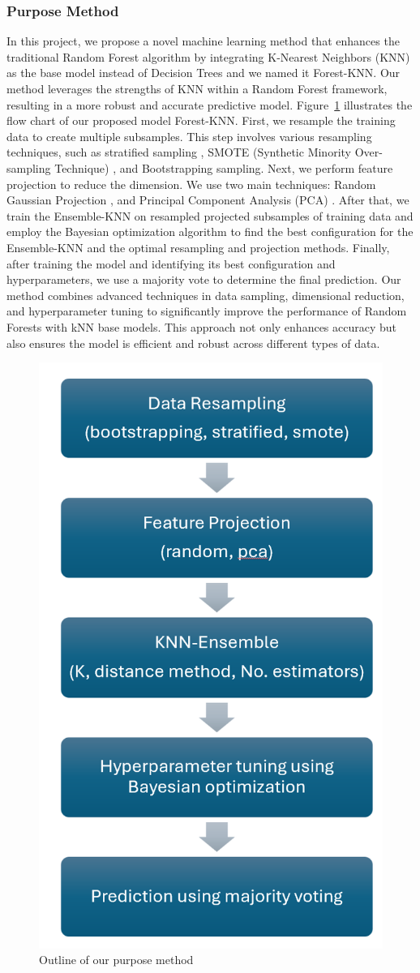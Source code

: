 \documentclass[a4paper]{article}
\begin{document}
\subsubsection{Purpose Method}
In this project, we propose a novel machine learning method that enhances the traditional Random Forest \citep{Random_Forest} algorithm by integrating K-Nearest Neighbors (KNN) as the base model instead of Decision Trees and we named it Forest-KNN. Our method leverages the strengths of KNN within a Random Forest framework, resulting in a more robust and accurate predictive model. Figure~\ref{fig:purposeMethod} illustrates the flow chart of our proposed model Forest-KNN.
First, we resample the training data to create multiple subsamples. This step involves various resampling techniques, such as stratified sampling \citep{stratified}, SMOTE (Synthetic Minority Over-sampling Technique) \citep{smote}, and Bootstrapping sampling.
Next, we perform feature projection to reduce the dimension. We use two main techniques: Random Gaussian Projection \citep{randomProjection}, and Principal Component Analysis (PCA) \citep{PCA}.
After that, we train the Ensemble-KNN on resampled projected subsamples of training data and employ the Bayesian optimization algorithm \citep{hyperparameter_Bayesian} to find the best configuration for the Ensemble-KNN and the optimal resampling and projection methods. 
Finally, after training the model and identifying its best configuration and hyperparameters, we use a majority vote to determine the final prediction.
Our method combines advanced techniques in data sampling, dimensional reduction, and hyperparameter tuning to significantly improve the performance of Random Forests with kNN base models. This approach not only enhances accuracy but also ensures the model is efficient and robust across different types of data.
\begin{figure}
    \centering
    \includegraphics[width=0.2\linewidth]{OFU-xAI-Proj-Template_v0.2/images/PurposeMethod.png}
    \caption{Outline of our purpose method}
    \label{fig:purposeMethod}
\end{figure}
\end{document}
